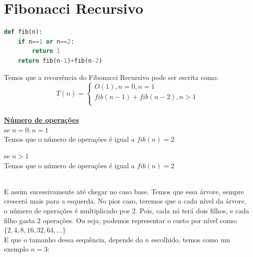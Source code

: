 \documentclass[a4paper, 12pt]{article}
\begin{document}
\newpage

\section{Fibonacci Recursivo}

\begin{lstlisting}[language=Python, caption= Código da função do Fibonacci Recursivo]
def fib(n):
	if n==1 or n==2:
		return 1
	return fib(n-1)+fib(n-2)
\end{lstlisting}

Temos que a recorrência do Fibonacci Recursivo pode ser escrita como:
\begin{equation}
T(n) = \left\{ \begin{array}{l}
O(1), n=0, n=1 \\
fib(n-1)+fib(n-2), n>1\\
\end{array}
\right.
\end{equation} \\

\large\underline{\bf Número de operações} \\

se $n = 0, n = 1$\\
Temos que o número de operações é igual a $fib(n) = 2$

se $n>1$\\
Temos que o número de operações é igual a $fib(n) = 2$ \\

 \\

E assim sucessivamente até chegar no caso base. Temos que essa árvore, sempre crescerá mais para a esquerda. No pior caso, teremos que a cada nível da árvore, o número de operações é multiplicado por 2. Pois, cada nó terá dois filhos, e cada filho gasta 2 operações. Ou seja, podemos representar o custo por nível como: \\
$\{2,4,8,16,32,64,...\}$ \\

E que o tamanho dessa sequência, depende do $n$ escolhido, temos como um exemplo $n=3$: \\
\end{document}
